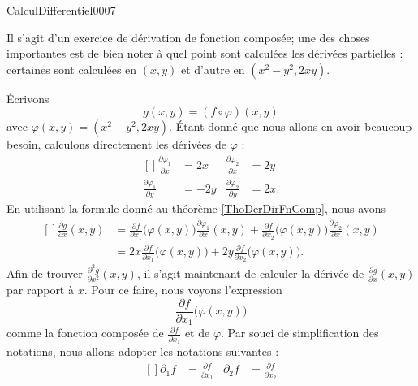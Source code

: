 \begin{corrige}{CalculDifferentiel0007}

	Il s'agit d'un exercice de dérivation de fonction composée; une des choses importantes est de bien noter à quel point sont calculées les dérivées partielles : certaines sont calculées en $(x,y)$ et d'autre en $(x^2-y^2,2xy)$. 

	Écrivons
	\begin{equation}
		g(x,y)=(f\circ\varphi)(x,y)
	\end{equation}
	avec $\varphi(x,y)=(x^2-y^2,2xy)$. Étant donné que nous allons en avoir beaucoup besoin, calculons directement les dérivées de $\varphi$ :
	\begin{equation}
		\begin{aligned}[]
			\frac{ \partial \varphi_1 }{ \partial x }&=2x	&\frac{ \partial \varphi_2 }{ \partial x }&=2y\\
			\frac{ \partial \varphi_1 }{ \partial y }&=-2y	&\frac{ \partial \varphi_2 }{ \partial y }&=2x.
		\end{aligned}
	\end{equation}
	En utilisant la formule donné au théorème \ref{ThoDerDirFnComp}, nous avons
	\begin{equation}
		\begin{aligned}[]
			\frac{ \partial g }{ \partial x }(x,y)&=\frac{ \partial f }{ \partial x_1 }\big( \varphi(x,y) \big)\frac{ \partial \varphi_1 }{ \partial x }(x,y)+\frac{ \partial f }{ \partial x_2 }\big( \varphi(x,y) \big)\frac{ \partial \varphi_2 }{ \partial x }(x,y)\\
			&=2x\frac{ \partial f }{ \partial x_1 }\big( \varphi(x,y) \big)+2y\frac{ \partial f }{ \partial x_2 }\big( \varphi(x,y) \big).
		\end{aligned}
	\end{equation}
	Afin de trouver $\frac{ \partial^2g }{ \partial x^2 }(x,y)$, il s'agit maintenant de calculer la dérivée de $\frac{ \partial g }{ \partial x }(x,y)$ par rapport à $x$. Pour ce faire, nous voyons l'expression
	\begin{equation}
		\frac{ \partial f }{ \partial x_1 }\big( \varphi(x,y) \big)
	\end{equation}
	comme la fonction composée de $\frac{ \partial f }{ \partial x_1 }$ et de $\varphi$. Par souci de simplification des notations, nous allons adopter les notations suivantes :
	\begin{equation}
		\begin{aligned}[]
			\partial_1f&=\frac{ \partial f }{ \partial x_1 }&\partial_2f&=\frac{ \partial f }{ \partial x_2 }\\

\end{aligned}
\end{equation}
\end{corrige}
